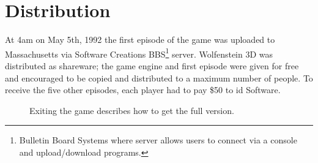 \documentclass[book.tex]{subfiles}
\begin{document}
\section{Distribution}
At 4am on May 5th, 1992 the first episode of the game was uploaded to Massachusetts via Software Creations BBS\footnote{Bulletin Board Systems where server allows users to connect via a console and upload/download programs.} server. Wolfenstein 3D was distributed as shareware; the game engine and first episode were given for free and encouraged to be copied and distributed to a maximum number of people. To receive the five other episodes, each player had to pay \$50 to id Software.\\
\par
\begin{figure}[H]
\centering
 \caption{Exiting the game describes how to get the full version.}
 \end{figure}
\end{document}
